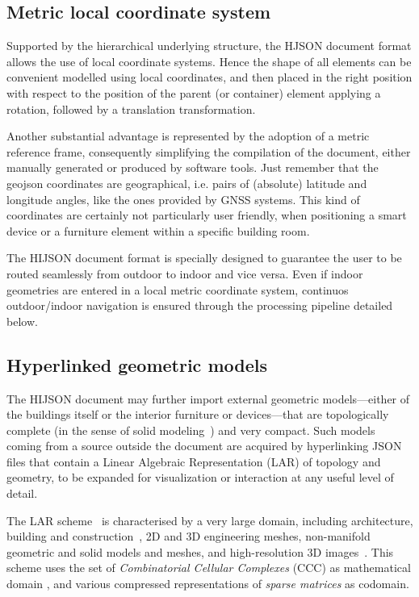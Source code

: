 \subsection{Metric local coordinate system}\label{metric-local-coordinate-system}

Supported by the hierarchical underlying structure, the HJSON document format allows 
the use of local coordinate systems. Hence the shape of all elements can 
be convenient modelled using local coordinates, and then placed in the right position 
with respect to the position of the parent (or container) element applying a rotation, followed by a
translation transformation.

Another substantial advantage is represented by the adoption of a metric
reference frame,  consequently simplifying the compilation of the document,
either manually generated or produced by software tools. Just remember that
the geojson coordinates are geographical, i.e. pairs of (absolute) latitude
and longitude angles, like the ones provided by GNSS systems. This kind of
coordinates  are certainly not particularly user friendly, when positioning a
smart device or a furniture element within a specific building room.

The HIJSON document format is specially designed to guarantee the user to be routed seamlessly 
from outdoor to indoor and vice versa. Even if indoor geometries are entered in a local metric 
coordinate system, continuos outdoor/indoor navigation is ensured through the processing pipeline
detailed below.

\subsection{Hyperlinked geometric models}\label{optional-lar}

The HIJSON document may further import external geometric models---either of the buildings itself or the interior furniture or devices---that are topologically complete (in the sense of solid modeling~\cite{Requicha:1980:RRS:356827.356833}) and very compact. 
Such models coming from a source outside the document are acquired by hyperlinking JSON files that contain a Linear Algebraic Representation (LAR) of topology and geometry, to be expanded for visualization or interaction at any useful level of detail. 

The LAR scheme~\cite{Dicarlo:2014:TNL:2543138.2543294} is characterised by a very large domain, including architecture, building and construction~\cite{paoluzziMS:2014}, 2D and 3D engineering meshes, non-manifold geometric and solid models and meshes, and high-resolution 3D images~\cite{cadanda:2015}. This scheme uses the set of \emph{Combinatorial Cellular Complexes} (CCC) as mathematical domain
\cite{Basak:2010}, and various compressed representations of \emph{sparse matrices} \cite{gemmexp} as codomain. 

